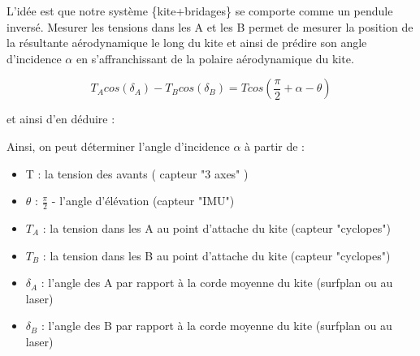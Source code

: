 \documentclass[conference]{IEEEtran}
\begin{document}
L'idée est que notre système \{kite+bridages\} se comporte comme un pendule inversé. Mesurer les tensions dans les A et les B permet de mesurer la position de la résultante aérodynamique le long du kite et ainsi de prédire son angle d'incidence $\alpha$ en s'affranchissant de la polaire aérodynamique du kite. 


\begin{center}
    \begin{equation}
        T_A cos(\delta_A) - T_B cos(\delta_B) = T cos(\frac{\pi}{2} +\alpha - \theta)
    \end{equation}
\end{center}

et ainsi d'en déduire :


Ainsi, on peut déterminer l'angle d'incidence $\alpha$ à partir de :
\begin{itemize}
    \item T : la tension des avants ( capteur "3 axes" )
    \item $\theta$ : $\frac{\pi}{2}$ - l'angle d'élévation (capteur "IMU")
    \item $T_A$ : la tension dans les A au point d'attache du kite (capteur "cyclopes")
    \item $T_B$ : la tension dans les B au point d'attache du kite (capteur "cyclopes")
    \item $\delta_A$ : l'angle des A par rapport à la corde moyenne du kite (surfplan ou au laser)
    \item $\delta_B$ : l'angle des B par rapport à la corde moyenne du kite (surfplan ou au laser)
\end{itemize}
\end{document}

